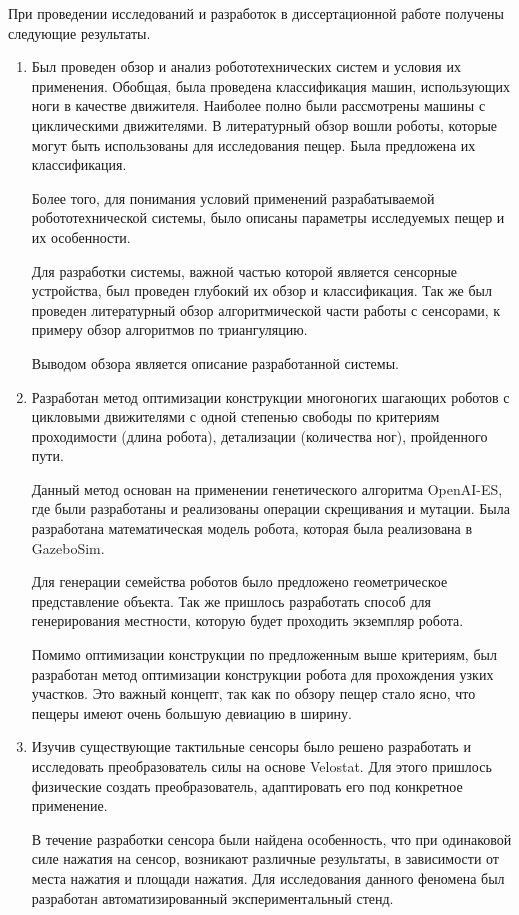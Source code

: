 При  проведении  исследований  и  разработок  в  диссертационной  работе  получены следующие результаты.
\begin{enumerate}
  \item Был проведен обзор и анализ робототехнических систем и условия их применения. Обобщая, была проведена классификация машин, использующих ноги в качестве движителя. Наиболее полно были рассмотрены машины с циклическими движителями. В литературный обзор вошли роботы, которые могут быть использованы для исследования пещер. Была предложена их классификация.

  Более того, для понимания условий применений разрабатываемой робототехнической системы, было описаны параметры исследуемых пещер и их особенности.

  Для разработки системы, важной частью которой является сенсорные устройства, был проведен глубокий их обзор и классификация. Так же был проведен литературный обзор алгоритмической части работы с сенсорами, к примеру обзор алгоритмов по триангуляцию.

  Выводом обзора является описание разработанной системы.
  \item Разработан метод оптимизации конструкции многоногих шагающих роботов с цикловыми движителями с одной степенью свободы по критериям проходимости (длина робота), детализации (количества ног), пройденного пути.

  Данный метод основан на применении генетического алгоритма OpenAI-ES, где были разработаны и реализованы операции скрещивания и мутации. Была разработана математическая модель робота, которая была реализована в GazeboSim. 
  
  Для генерации семейства роботов было предложено геометрическое представление объекта. Так же пришлось разработать способ для генерирования местности, которую будет проходить экземпляр робота.

  Помимо оптимизации конструкции по предложенным выше критериям, был разработан метод оптимизации конструкции робота для прохождения узких участков. Это важный концепт, так как по обзору пещер стало ясно, что пещеры имеют очень большую девиацию в ширину.
  \item Изучив существующие тактильные сенсоры было решено разработать и исследовать преобразователь силы на основе Velostat. Для этого пришлось физические создать преобразователь, адаптировать его под конкретное применение.

  В течение разработки сенсора были найдена особенность, что при одинаковой силе нажатия на сенсор, возникают различные результаты, в зависимости от места нажатия и площади нажатия. Для исследования данного феномена был разработан автоматизированный экспериментальный стенд. 
  

\end{enumerate}
